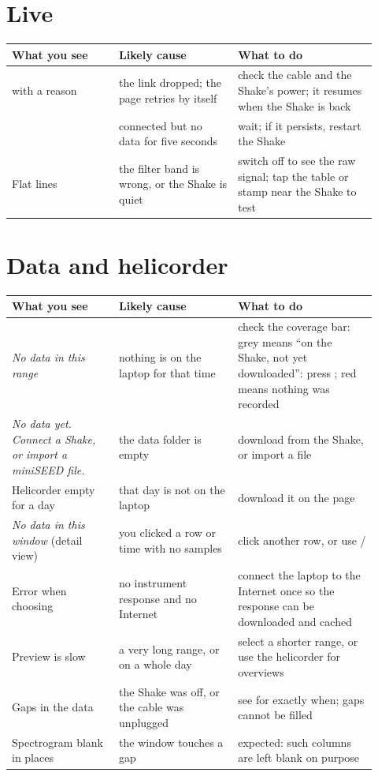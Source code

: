 \section{Live}
\begin{longtable}{@{}L{0.27\linewidth}L{0.30\linewidth}L{0.35\linewidth}@{}}
\toprule
What you see & Likely cause & What to do\\ \midrule\endhead
{} with a reason & the link dropped; the page retries by itself & check the cable and the Shake's power; it resumes when the Shake is back\\
 & connected but no data for five seconds & wait; if it persists, restart the Shake\\
Flat lines & the filter band is wrong, or the Shake is quiet & switch  off to see the raw signal; tap the table or stamp near the Shake to test\\
\bottomrule
\end{longtable}

\section{Data and helicorder}
\begin{longtable}{@{}L{0.27\linewidth}L{0.30\linewidth}L{0.35\linewidth}@{}}
\toprule
What you see & Likely cause & What to do\\ \midrule\endhead
\emph{No data in this range} & nothing is on the laptop for that time & check the coverage bar: grey means ``on the Shake, not yet downloaded'': press ; red means nothing was recorded\\
\emph{No data yet. Connect a Shake, or import a miniSEED file.} & the data folder is empty & download from the Shake, or import a file\\
Helicorder empty for a day & that day is not on the laptop & download it on the  page\\
\emph{No data in this window} (detail view) & you clicked a row or time with no samples & click another row, or use /\\
Error when choosing  & no instrument response and no Internet & connect the laptop to the Internet once so the response can be downloaded and cached\\
Preview is slow & a very long range, or  on a whole day & select a shorter range, or use the helicorder for overviews\\
Gaps in the data & the Shake was off, or the cable was unplugged & see  for exactly when; gaps cannot be filled\\
Spectrogram blank in places & the window touches a gap & expected: such columns are left blank on purpose\\
\bottomrule
\end{longtable}

